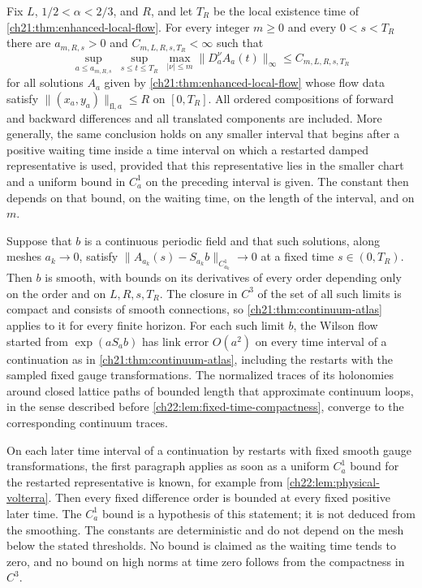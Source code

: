 \begin{theorem}\label{ch22:thm:positive-window-bootstrap}
Fix $L$, $1/2<\alpha<2/3$, and $R$, and let $T_R$ be the local existence time of \cref{ch21:thm:enhanced-local-flow}. For every integer $m\ge0$ and every $0<s<T_R$ there are $a_{m,R,s}>0$ and $C_{m,L,R,s,T_R}<\infty$ such that
\[
 \sup_{a\le a_{m,R,s}}\ \sup_{s\le t\le T_R}\ \max_{|\nu|\le m}\|D_a^\nu A_a(t)\|_\infty\le C_{m,L,R,s,T_R}
\]
for all solutions $A_a$ given by \cref{ch21:thm:enhanced-local-flow} whose flow data satisfy $\|(x_a,y_a)\|_{\mathrm{fl},a}\le R$ on $[0,T_R]$. All ordered compositions of forward and backward differences and all translated components are included. More generally, the same conclusion holds on any smaller interval that begins after a positive waiting time inside a time interval on which a restarted damped representative is used, provided that this representative lies in the smaller chart and a uniform bound in $C_a^1$ on the preceding interval is given. The constant then depends on that bound, on the waiting time, on the length of the interval, and on $m$.

Suppose that $b$ is a continuous periodic field and that such solutions, along meshes $a_k\to0$, satisfy $\|A_{a_k}(s)-S_{a_k}b\|_{C^1_{a_k}}\to0$ at a fixed time $s\in(0,T_R)$. Then $b$ is smooth, with bounds on its derivatives of every order depending only on the order and on $L,R,s,T_R$. The closure in $C^3$ of the set of all such limits is compact and consists of smooth connections, so \cref{ch21:thm:continuum-atlas} applies to it for every finite horizon. For each such limit $b$, the Wilson flow started from $\exp(aS_ab)$ has link error $O(a^2)$ on every time interval of a continuation as in \cref{ch21:thm:continuum-atlas}, including the restarts with the sampled fixed gauge transformations. The normalized traces of its holonomies around closed lattice paths of bounded length that approximate continuum loops, in the sense described before \cref{ch22:lem:fixed-time-compactness}, converge to the corresponding continuum traces.

On each later time interval of a continuation by restarts with fixed smooth gauge transformations, the first paragraph applies as soon as a uniform $C^1_a$ bound for the restarted representative is known, for example from \cref{ch22:lem:physical-volterra}. Then every fixed difference order is bounded at every fixed positive later time. The $C^1_a$ bound is a hypothesis of this statement; it is not deduced from the smoothing. The constants are deterministic and do not depend on the mesh below the stated thresholds. No bound is claimed as the waiting time tends to zero, and no bound on high norms at time zero follows from the compactness in $C^3$.
\end{theorem}

